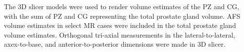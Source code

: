 The 3D slicer models were used to render volume estimates of the PZ and CG,
with the sum of PZ and CG representing the total prostate gland volume.  AFS
volume estimates in select MR cases were included in the total prostate gland
volume estimates.  Orthogonal tri-axial measurements in the lateral-to-lateral,
axex-to-base, and anterior-to-posterior dimensions were made in 3D slicer.
